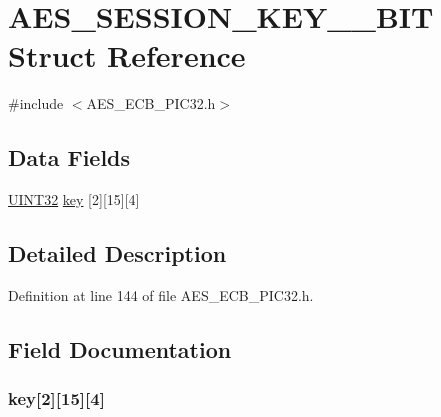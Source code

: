\hypertarget{struct_a_e_s___s_e_s_s_i_o_n___k_e_y__256___b_i_t}{}\section{A\+E\+S\+\_\+\+S\+E\+S\+S\+I\+O\+N\+\_\+\+K\+E\+Y\+\_\+\_\+\+B\+I\+T Struct Reference}
\label{struct_a_e_s___s_e_s_s_i_o_n___k_e_y__256___b_i_t}


{\ttfamily \#include $<$A\+E\+S\+\_\+\+E\+C\+B\+\_\+\+P\+I\+C32.\+h$>$}

\subsection*{Data Fields}
\begin{DoxyCompactItemize}
\item 
\hyperlink{_generic_type_defs_8h_a1720f33f59b583f0c2ed071815623a86}{U\+I\+N\+T32} \hyperlink{struct_a_e_s___s_e_s_s_i_o_n___k_e_y__256___b_i_t_a16808d95c46dc7f427540f024e4bdd09}{key} \mbox{[}2\mbox{]}\mbox{[}15\mbox{]}\mbox{[}4\mbox{]}
\end{DoxyCompactItemize}


\subsection{Detailed Description}


Definition at line 144 of file A\+E\+S\+\_\+\+E\+C\+B\+\_\+\+P\+I\+C32.\+h.



\subsection{Field Documentation}
\hypertarget{struct_a_e_s___s_e_s_s_i_o_n___k_e_y__256___b_i_t_a16808d95c46dc7f427540f024e4bdd09}{}
\subsubsection[{key}]{ key\mbox{[}2\mbox{]}\mbox{[}15\mbox{]}\mbox{[}4\mbox{]}}\label{struct_a_e_s___s_e_s_s_i_o_n___k_e_y__256___b_i_t_a16808d95c46dc7f427540f024e4bdd09}


